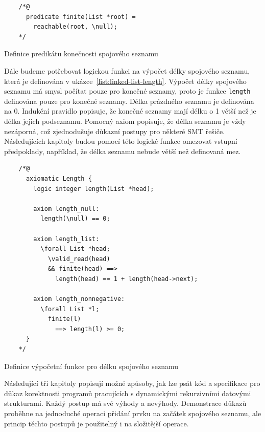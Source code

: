 \begin{listing}[H]
    \begin{verbatim}
    /*@
      predicate finite(List *root) =
        reachable(root, \null);
    */
    \end{verbatim}
    \caption{Definice predikátu konečnosti spojového seznamu}
    \label{list:linked-list-finite}
\end{listing}

Dále budeme potřebovat logickou funkci na výpočet délky spojového seznamu,
která je definována v ukázce~\ref{list:linked-list-length}.
Výpočet délky spojového seznamu má smysl počítat pouze pro konečné seznamy,
proto je funkce \texttt{length} definována pouze pro konečné seznamy.
Délka prázdného seznamu je definována na 0.
Indukční pravidlo popisuje, že konečné seznamy mají délku o 1 větší než je délka jejich podseznamu.
Pomocný axiom popisuje, že délka seznamu je vždy nezáporná,
což zjednodušuje důkazní postupy pro některé SMT řešiče.
Následujících kapitoly budou pomocí této logické funkce
omezovat vstupní předpoklady, například,
že délka seznamu nebude větší než definovaná mez.


\begin{listing}[H]
    \begin{verbatim}
    /*@
      axiomatic Length {
        logic integer length(List *head);

        axiom length_null:
          length(\null) == 0;

        axiom length_list:
          \forall List *head;
            \valid_read(head)
            && finite(head) ==>
              length(head) == 1 + length(head->next);

        axiom length_nonnegative:
          \forall List *l;
            finite(l)
              ==> length(l) >= 0;
      }
    */
    \end{verbatim}
    \caption{Definice výpočetní funkce pro délku spojového seznamu}
    \label{list:linked-list-length}
\end{listing}

Následující tři kapitoly popisují možné způsoby,
jak lze psát kód a specifikace pro důkaz korektnosti programů pracujících
s dynamickými rekurzivními datovými strukturami.
Každý postup má své výhody a nevýhody.
Demonstrace důkazů proběhne na jednoduché operaci přidání prvku na začátek spojového seznamu,
ale princip těchto postupů je použitelný i na složitější operace.

